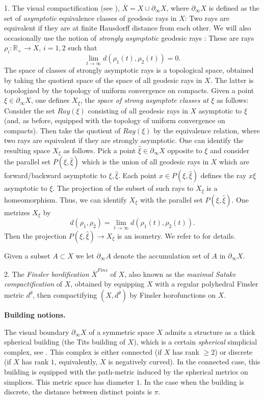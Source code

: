\documentclass[12pt]{article}
\theoremstyle{boldplain}
\theoremstyle{bolddefinition}
\numberwithin{equation}{section}
\def\R{{\mathbb R}}
\def\geo{\partial_{\infty}}
\def\ol{\overline}
\begin{document}
1. The visual compactification (see \cite{BGS}), $\ol{X}= X\cup \geo X$, where $\geo X$ is defined as the set of {\em asymptotic} equivalence classes of geodesic rays in $X$: Two rays are equivalent if they are at finite Hausdorff distance from each other. We will also occasionally use the notion of {\em strongly asymptotic} geodesic rays : These are rays $\rho_i: \R_+\to X$, $i=1, 2$ such that
$$
\lim_{t\to\infty} d(\rho_1(t), \rho_2(t))=0. 
$$ 
The space of classes of strongly asymptotic rays is a topological space, obtained by taking the quotient space of the space of all geodesic rays in $X$. The latter is topologized by the topology of uniform convergence on compacts. Given a point $\xi\in \geo X$, one 
defines $X_{\xi}$, the {\em space of strong asymptote classes at $\xi$} as follows: Consider the set $Ray(\xi)$ consisting of all geodesic rays in $X$ asymptotic to $\xi$ (and, as before, equipped with the topology of uniform convergence on compacts). Then take the quotient of $Ray(\xi)$ by the equivalence relation, where two rays are equivalent if they are strongly asymptotic. One can identify the resulting space $X_\xi$ as follows. Pick a point $\hat\xi\in \geo X$ opposite to $\xi$ and consider the parallel set $P(\xi, \hat\xi)$ which is the  union of all geodesic rays in $X$ which are forward/backward asymptotic to $\xi, \hat\xi$. Each point $x\in P(\xi, \hat\xi)$ defines the ray $x\xi$ asymptotic to $\xi$. 
The projection of the subset of such rays to $X_\xi$ is a homeomorphism. Thus, we can identify $X_\xi$ with the parallel set $P(\xi, \hat\xi)$. 
One metrizes $X_\xi$ by
$$
d(\rho_1, \rho_2)= \lim_{t\to\infty} d(\rho_1(t), \rho_2(t)). 
$$
Then the projection $P(\xi, \hat\xi)\to X_\xi$ is an isometry. We refer to \cite[2.8]{anolec} for details. 



Given a subset $A\subset X$ we let $\geo A$ denote the accumulation set of $A$ in $\geo X$.


2. The {\em Finsler bordification} $\ol{X}^{Fins}$ of $X$, also known as the {\em maximal Satake compactification} of $X$, obtained by equipping $X$ with a regular polyhedral Finsler metric $d^{\bar{\theta}}$, then compactifying $(X, d^{\bar{\theta}})$ by Finsler horofunctions on $X$.  


{\bf Building notions.} 

The visual boundary $\geo X$ of a symmetric space $X$ admits a structure as a 
thick spherical building (the Tits building of $X$), which is a certain {\em spherical} simplicial complex, see \cite{Eberlein, BGS}. This complex is either connected (if $X$ has rank $\ge 2$) or discrete (if $X$ has rank $1$, equivalently, $X$ is negatively curved).  In the connected case,  this building is equipped with the path-metric induced by the spherical metrics on simplices. This metric space has diameter $1$. In the case when the building is discrete,  the distance between distinct 
points is $\pi$.  
\end{document}
